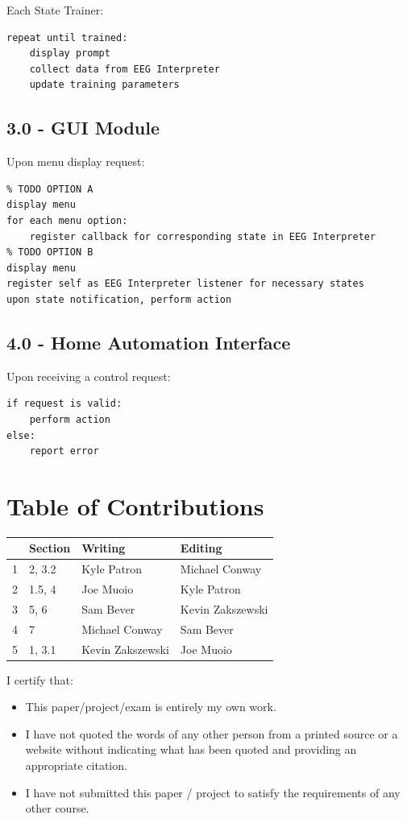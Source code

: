 \documentclass{article}
\begin{document}
Each State Trainer:

\begin{lstlisting}
repeat until trained:
    display prompt
    collect data from EEG Interpreter
    update training parameters
\end{lstlisting}

\subsection*{3.0 - GUI Module}

Upon menu display request:
\begin{lstlisting}
% TODO OPTION A
display menu
for each menu option:
    register callback for corresponding state in EEG Interpreter
% TODO OPTION B
display menu
register self as EEG Interpreter listener for necessary states
upon state notification, perform action
\end{lstlisting}

\subsection*{4.0 - Home Automation Interface}

Upon receiving a control request:

\begin{lstlisting}
if request is valid:
    perform action
else:
    report error
\end{lstlisting}

\newpage

\section*{\centering Table of Contributions}
\begin{tabular}{| l | l | l | l |}
    \hline
     & Section & Writing & Editing \\
    \hline \hline
		1 & 2, 3.2 & Kyle Patron & Michael Conway \\ \hline
		2 & 1.5, 4 & Joe Muoio & Kyle Patron \\ \hline
		3 & 5, 6 & Sam Bever &  Kevin Zakszewski \\ \hline
		4 & 7 & Michael Conway &  Sam Bever \\ \hline
		5 & 1, 3.1 & Kevin Zakszewski &  Joe Muoio \\ \hline
\end{tabular}
\newpage
\noindent I certify that:
\begin{itemize}
\item This paper/project/exam is entirely my own work.
\item I have not quoted the words of any other person from a printed source or a website without indicating what has been quoted and providing an appropriate citation.
\item I have not submitted this paper / project to satisfy the requirements of any other course.
\end{itemize}
\end{document}
